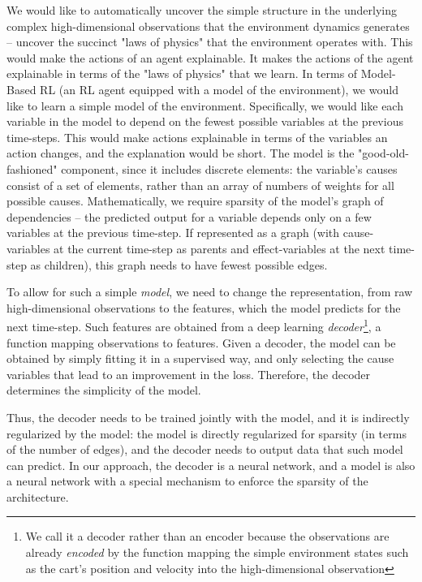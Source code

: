 \documentclass[a4paper,11pt,oneside]{report}
\begin{document}
We would like to automatically uncover the simple structure in the underlying complex high-dimensional observations that the environment dynamics generates -- uncover the succinct "laws of physics" that the environment operates with.
This would make the actions of an agent explainable.
It makes the actions of the agent explainable in terms of the "laws of physics" that we learn. In terms of Model-Based RL\cite{DeBruin2018,Corneil2018} (an RL agent equipped with a model of the environment), we would like to learn a simple model of the environment.
Specifically, we would like each variable in the model to depend on the fewest possible variables at the previous time-steps. This would make actions explainable in terms of the variables an action changes, and the explanation would be short. The model is the "good-old-fashioned" component, since it includes discrete elements: the variable's causes consist of a set of elements, rather than an array of numbers of weights for all possible causes.
Mathematically, we require sparsity of the model's graph of dependencies -- the predicted output for a variable depends only on a few variables at the previous time-step. If represented as a graph (with cause-variables at the current time-step as parents and effect-variables at the next time-step as children), this graph needs to have fewest possible edges.

To allow for such a simple {\em model}, we need to change the representation, from raw high-dimensional observations to the features, which the model predicts for the next time-step. Such features are obtained from a deep learning {\em decoder}\footnote{We call it a decoder rather than an encoder because the observations are already {\em encoded} by the function mapping the simple environment states such as the cart's position and velocity into the high-dimensional observation}, a function mapping observations to features. Given a decoder, the model can be obtained by simply fitting it in a supervised way, and only selecting the cause variables that lead to an improvement in the loss. Therefore, the decoder determines the simplicity of the model.

Thus, the decoder needs to be trained jointly with the model, and it is indirectly regularized by the model: the model is directly regularized for sparsity (in terms of the number of edges), and the decoder needs to output data that such model can predict.
In our approach, the decoder is a neural network, and a model is also a neural network with a special mechanism to enforce the sparsity of the architecture.
\end{document}
